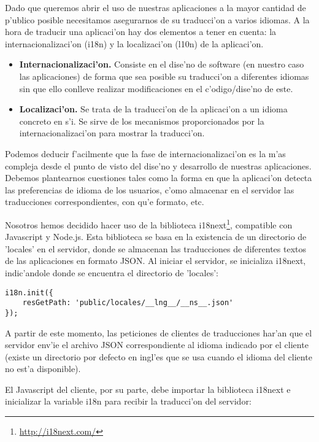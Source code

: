 Dado que queremos abrir el uso de nuestras aplicaciones a la mayor cantidad de p'ublico posible necesitamos
asegurarnos de su traducci'on a varios idiomas. A la hora de traducir una aplicaci'on hay dos elementos a tener en
cuenta: la internacionalizaci'on (i18n) y la localizaci'on (l10n) de la aplicaci'on.

\begin{itemize}
\item \textbf{Internacionalizaci'on.} Consiste en el dise'no de software (en nuestro caso las aplicaciones) de forma
que sea posible su traducci'on a diferentes idiomas sin que ello conlleve realizar modificaciones en el
c'odigo/dise'no de este.
\item \textbf{Localizaci'on.} Se trata de la traducci'on de la aplicaci'on a un idioma concreto en s'i. Se sirve de
los mecanismos proporcionados por la internacionalizaci'on para mostrar la traducci'on.
\end{itemize}

Podemos deducir f'acilmente que la fase de internacionalizaci'on es la m'as compleja desde el punto de visto del
dise'no y desarrollo de nuestras aplicaciones. Debemos plantearnos cuestiones tales como la forma en que la
aplicaci'on detecta las preferencias de idioma de los usuarios, c'omo almacenar en el servidor las traducciones
correspondientes, con qu'e formato, etc.

Nosotros hemos decidido hacer uso de la biblioteca i18next\footnote{\url{http://i18next.com/}}, compatible con 
Javascript y Node.js. Esta biblioteca se basa en la existencia de un directorio de 'locales' en el servidor, donde 
se almacenan las traducciones de diferentes textos de las aplicaciones en formato JSON. Al iniciar el servidor, se 
inicializa i18next, indic'andole donde se encuentra el directorio de 'locales':

\begin{verbatim}
i18n.init({
    resGetPath: 'public/locales/__lng__/__ns__.json'
});
\end{verbatim}

A partir de este momento, las peticiones de clientes de traducciones har'an que el servidor env'ie el archivo JSON
correspondiente al idioma indicado por el cliente (existe un directorio por defecto en ingl'es que se usa cuando el
idioma del cliente no est'a disponible).

El Javascript del cliente, por su parte,  debe importar la biblioteca i18next e inicializar la variable i18n para
recibir la traducci'on del servidor:

